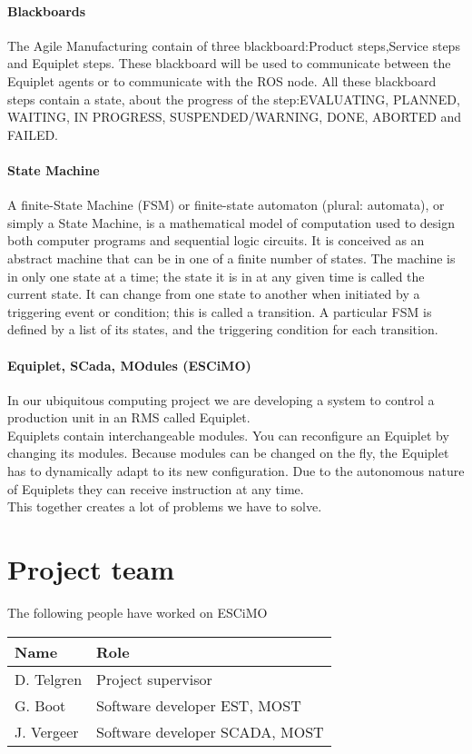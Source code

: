 \documentclass[12pt,a4paper]{report}
\begin{document}
\subsubsection{Blackboards}
The Agile Manufacturing contain of three blackboard:Product steps,Service steps and Equiplet steps. These blackboard will be used to communicate between the Equiplet agents or to communicate with the ROS node. All these blackboard steps contain a state, about the progress of the step:EVALUATING, PLANNED, WAITING, IN PROGRESS, SUSPENDED/WARNING, DONE, ABORTED and FAILED.

\subsubsection{State Machine}
A finite-State Machine (FSM) or finite-state automaton (plural: automata), or simply a State Machine, is a mathematical model of computation used to design both computer programs and sequential logic circuits. It is conceived as an abstract machine that can be in one of a finite number of states. The machine is in only one state at a time; the state it is in at any given time is called the current state. It can change from one state to another when initiated by a triggering event or condition; this is called a transition. A particular FSM is defined by a list of its states, and the triggering condition for each transition.\cite{state_machine}

\subsubsection{Equiplet, SCada, MOdules (ESCiMO)}
In our ubiquitous computing project we are developing a system to control a production unit in an RMS called Equiplet.\\ 
Equiplets contain interchangeable modules. 
You can reconfigure an Equiplet by changing its modules.
Because modules can be changed on the fly, the Equiplet has to dynamically adapt to its new configuration.
Due to the autonomous nature of Equiplets they can receive instruction at any time.\\
This together creates a lot of problems we have to solve.

\chapter{Project team}
The following people have worked on ESCiMO

\begin{tabular}{l | l}
Name       & Role \\
\hline
D. Telgren & Project supervisor \\
G. Boot    & Software developer EST, MOST \\
J. Vergeer & Software developer SCADA, MOST
\end{tabular}
\end{document}
